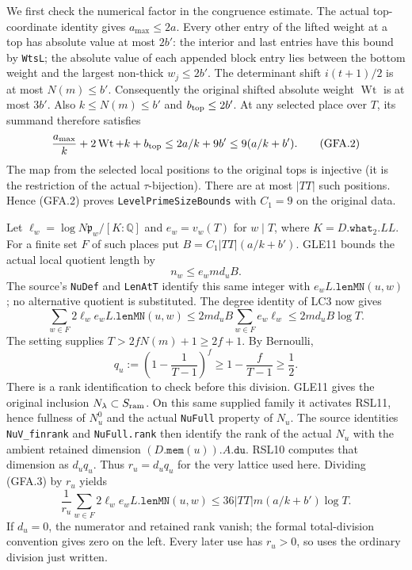 We first check the numerical factor in the congruence estimate.  The
actual top-coordinate identity gives $a_{\max}\le2a$.  Every other
entry of the lifted weight at a top has absolute value at most $2b'$:
the interior and last entries have this bound by \texttt{WtsL}; the
absolute value of each appended block entry lies between the
bottom weight and the largest non-thick $w_j\le2b'$.  The determinant shift
$i(t+1)/2$ is at most $N(m)\le b'$.  Consequently the original
shifted absolute weight $\operatorname{Wt}$ is at most $3b'$.
Also $k\le N(m)\le b'$ and $b_{\rm top}\le2b'$.
At any selected place over $T$, its summand therefore satisfies
\[
 \frac{a_{\max}}k+2\operatorname{Wt}+k+b_{\rm top}
 \le 2a/k+9b'\le9(a/k+b').                              \tag{GFA.2}
\]
The map from the selected local positions to the original tops is
injective (it is the restriction of the actual $\tau$-bijection).
There are at most $|TT|$ such positions.  Hence (GFA.2) proves
\texttt{LevelPrimeSizeBounds} with $C_1=9$ on the original data.

Let $\ell_w=\log N\mathfrak p_w/[K:\mathbb Q]$ and
$e_w=v_w(T)$ for $w\mid T$, where $K=D.\texttt{what}_2.LL$.
For a finite set $F$ of such places put
$B=C_1|TT|(a/k+b')$.  GLE11 bounds the actual local quotient length by
\[
 n_w\le e_w m d_u B.
\]
The source's \texttt{NuDef} and \texttt{LenAtT} identify this same
integer with $e_wL.\texttt{lenMN}(u,w)$; no alternative quotient is
substituted.  The degree identity of LC3 now gives
\[
 \sum_{w\in F}2\ell_we_wL.\texttt{lenMN}(u,w)
 \le2md_uB\sum_{w\in F}e_w\ell_w
 \le2md_uB\log T.                                      \tag{GFA.3}
\]
The setting supplies $T>2fN(m)+1\ge2f+1$.  By Bernoulli,
\[
 q_u:=\left(1-\frac1{T-1}\right)^f
 \ge1-\frac f{T-1}\ge\frac12.
\]
There is a rank identification to check before this division.
GLE11 gives the original inclusion $N_\lambda\subset S_{\rm ram}$.
On this same supplied family it activates RSL11, hence fullness
of $N_u^0$ and the actual \texttt{NuFull} property of $N_u$.
The source identities
\texttt{NuV\_finrank} and \texttt{NuFull.rank} then identify the
rank of the actual $N_u$ with the ambient retained dimension
$(D.\texttt{mem}(u)).A.\texttt{du}$.  RSL10 computes that dimension
as $d_uq_u$.  Thus $r_u=d_uq_u$ for the very lattice used here.
Dividing (GFA.3) by $r_u$ yields
\[
 \boxed{\quad
 \frac1{r_u}\sum_{w\in F}2\ell_we_wL.\texttt{lenMN}(u,w)
 \le36|TT|m(a/k+b')\log T.
 \quad}                                                 \tag{GFA.4}
\]
If $d_u=0$, the numerator and retained rank vanish; the formal
total-division convention gives zero on the left.  Every later use
has $r_u>0$, so uses the ordinary division just written.

